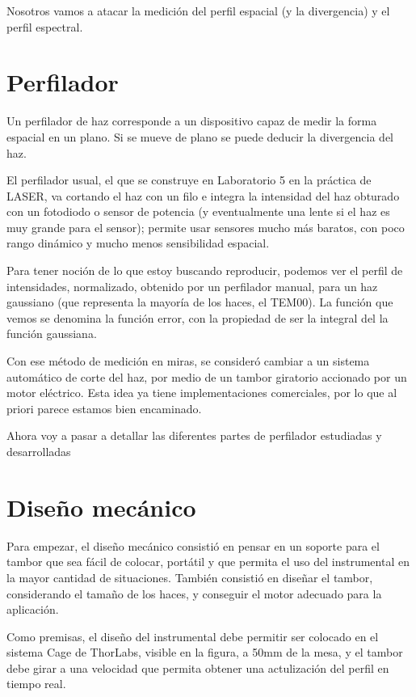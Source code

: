 \documentclass{article}
\begin{document}
Nosotros vamos a atacar la medición del perfil espacial (y la divergencia) y el perfil espectral.

\section{Perfilador}

Un perfilador de haz corresponde a un dispositivo capaz de medir la forma espacial en un plano. Si se mueve de plano se puede deducir la divergencia del haz. 

El perfilador usual, el que se construye en Laboratorio 5 en la práctica de LASER, va cortando el haz con un filo e integra la intensidad del haz obturado con un fotodiodo o sensor de potencia (y eventualmente una lente si el haz es muy grande para el sensor); permite usar sensores mucho más baratos, con poco rango dinámico y mucho menos sensibilidad espacial.

Para tener noción de lo que estoy buscando reproducir, podemos ver el perfil de intensidades, normalizado, obtenido por un perfilador manual, para un haz gaussiano (que representa la mayoría de los haces, el TEM00). La función que vemos se denomina la función error, con la propiedad de ser la integral del la función gaussiana.

Con ese método de medición en miras, se consideró cambiar a un sistema automático de corte del haz, por medio de un tambor giratorio accionado por un motor eléctrico. Esta idea ya tiene implementaciones comerciales, por lo que al priori parece estamos bien encaminado.

Ahora voy a pasar a detallar las diferentes partes de perfilador estudiadas y desarrolladas

\section{Diseño mecánico}

Para empezar, el diseño mecánico consistió en pensar en un soporte para el tambor que sea fácil de colocar, portátil y que permita el uso del instrumental en la mayor cantidad de situaciones. También consistió en diseñar el tambor, considerando el tamaño de los haces, y conseguir el motor adecuado para la aplicación.

Como premisas, el diseño del instrumental debe permitir ser colocado en el sistema Cage de ThorLabs, visible en la figura, a 50mm de la mesa, y el tambor debe girar a una velocidad que permita obtener una actulización del perfil en tiempo real.
\end{document}
